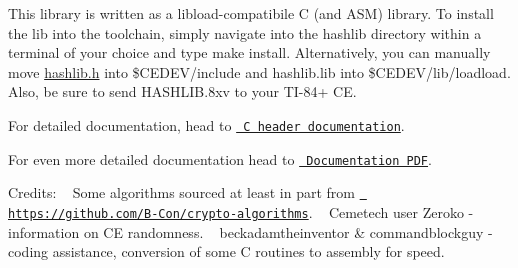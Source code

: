 This library is written as a libload-\/compatibile C (and ASM) library. To install the lib into the toolchain, simply navigate into the hashlib directory within a terminal of your choice and type {\ttfamily make install}. Alternatively, you can manually move {\ttfamily \mbox{\hyperlink{hashlib_8h}{hashlib.\+h}}} into {\ttfamily \$\+CEDEV/include} and {\ttfamily hashlib.\+lib} into {\ttfamily \$\+CEDEV/lib/loadload}. Also, be sure to send {\ttfamily HASHLIB.\+8xv} to your TI-\/84+ CE.

For detailed documentation, head to \href{https://acagliano.github.io/hashlib/html/hashlib_8h.html}{\texttt{ C header documentation}}.

For even more detailed documentation head to \href{https://github.com/acagliano/hashlib/blob/stable/Hashlib\%20Documentation.pdf}{\texttt{ Documentation PDF}}.

Credits\+: ~\newline
 Some algorithms sourced at least in part from \href{https://github.com/B-Con/crypto-algorithms}{\texttt{ https\+://github.\+com/\+B-\/\+Con/crypto-\/algorithms}}. ~\newline
 Cemetech user Zeroko -\/ information on CE randomness. ~\newline
 beckadamtheinventor \& commandblockguy -\/ coding assistance, conversion of some C routines to assembly for speed. ~\newline
 